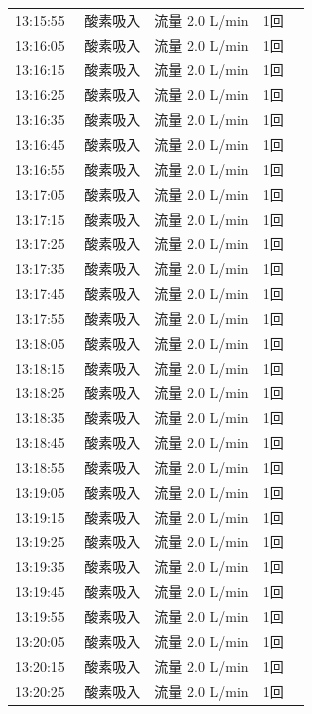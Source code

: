 \documentclass[UTF8,10pt,a4paper,fontset=fandol]{ctexart}
\begin{document}
\begin{minipage}[t]{0.48\linewidth}
\begin{tabular}{@{}p{0.22\linewidth}p{0.72\linewidth}@{}}
13:15:55 & 酸素吸入　流量 2.0 L/min　1回\\
13:16:05 & 酸素吸入　流量 2.0 L/min　1回\\
13:16:15 & 酸素吸入　流量 2.0 L/min　1回\\
13:16:25 & 酸素吸入　流量 2.0 L/min　1回\\
13:16:35 & 酸素吸入　流量 2.0 L/min　1回\\
13:16:45 & 酸素吸入　流量 2.0 L/min　1回\\
13:16:55 & 酸素吸入　流量 2.0 L/min　1回\\
13:17:05 & 酸素吸入　流量 2.0 L/min　1回\\
13:17:15 & 酸素吸入　流量 2.0 L/min　1回\\
13:17:25 & 酸素吸入　流量 2.0 L/min　1回\\
13:17:35 & 酸素吸入　流量 2.0 L/min　1回\\
13:17:45 & 酸素吸入　流量 2.0 L/min　1回\\
13:17:55 & 酸素吸入　流量 2.0 L/min　1回\\
13:18:05 & 酸素吸入　流量 2.0 L/min　1回\\
13:18:15 & 酸素吸入　流量 2.0 L/min　1回\\
13:18:25 & 酸素吸入　流量 2.0 L/min　1回\\
13:18:35 & 酸素吸入　流量 2.0 L/min　1回\\
13:18:45 & 酸素吸入　流量 2.0 L/min　1回\\
13:18:55 & 酸素吸入　流量 2.0 L/min　1回\\
13:19:05 & 酸素吸入　流量 2.0 L/min　1回\\
13:19:15 & 酸素吸入　流量 2.0 L/min　1回\\
13:19:25 & 酸素吸入　流量 2.0 L/min　1回\\
13:19:35 & 酸素吸入　流量 2.0 L/min　1回\\
13:19:45 & 酸素吸入　流量 2.0 L/min　1回\\
13:19:55 & 酸素吸入　流量 2.0 L/min　1回\\
13:20:05 & 酸素吸入　流量 2.0 L/min　1回\\
13:20:15 & 酸素吸入　流量 2.0 L/min　1回\\
13:20:25 & 酸素吸入　流量 2.0 L/min　1回\\
\end{tabular}
\end{minipage}

\end{document}
